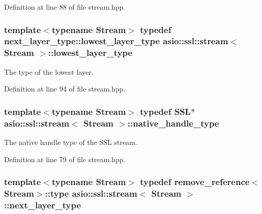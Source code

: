 Definition at line 88 of file stream.\+hpp.

\hypertarget{classasio_1_1ssl_1_1stream_ae3642d059991c8d0285b888673c677ca}{}
\subsubsection[{lowest\+\_\+layer\+\_\+type}]{\setlength{\rightskip}{0pt plus 5cm}template$<$typename Stream$>$ typedef next\+\_\+layer\+\_\+type\+::lowest\+\_\+layer\+\_\+type {\bf asio\+::ssl\+::stream}$<$ Stream $>$\+::{\bf lowest\+\_\+layer\+\_\+type}}\label{classasio_1_1ssl_1_1stream_ae3642d059991c8d0285b888673c677ca}


The type of the lowest layer. 



Definition at line 94 of file stream.\+hpp.

\hypertarget{classasio_1_1ssl_1_1stream_ad10bd7f631ed0704388d4dd90b5f3342}{}
\subsubsection[{native\+\_\+handle\+\_\+type}]{\setlength{\rightskip}{0pt plus 5cm}template$<$typename Stream$>$ typedef S\+S\+L$\ast$ {\bf asio\+::ssl\+::stream}$<$ Stream $>$\+::{\bf native\+\_\+handle\+\_\+type}}\label{classasio_1_1ssl_1_1stream_ad10bd7f631ed0704388d4dd90b5f3342}


The native handle type of the S\+S\+L stream. 



Definition at line 79 of file stream.\+hpp.

\hypertarget{classasio_1_1ssl_1_1stream_ae0c066ed414d0d7898b9d2e7998ef98e}{}
\subsubsection[{next\+\_\+layer\+\_\+type}]{\setlength{\rightskip}{0pt plus 5cm}template$<$typename Stream$>$ typedef remove\+\_\+reference$<$Stream$>$\+::type {\bf asio\+::ssl\+::stream}$<$ Stream $>$\+::{\bf next\+\_\+layer\+\_\+type}}\label{classasio_1_1ssl_1_1stream_ae0c066ed414d0d7898b9d2e7998ef98e}


